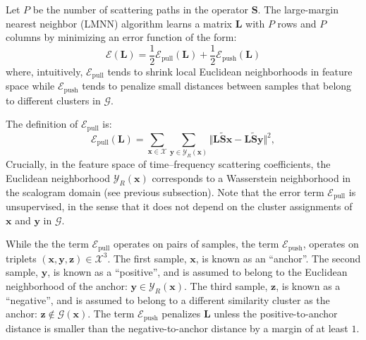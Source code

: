 \documentclass{bmcart}
\begin{document}
Let $P$ be the number of scattering paths in the operator $\mathbf{S}$. The large-margin nearest neighbor (LMNN) algorithm learns a matrix $\mathbf{L}$ with $P$ rows and $P$ columns by minimizing an error function of the form:
\begin{equation}
\mathcal{E}(\mathbf{L}) = \frac{1}{2} \mathcal{E}_{\textrm{pull}} (\mathbf{L}) + \frac{1}{2} \mathcal{E}_{\textrm{push}} (\mathbf{L})
\end{equation}
where, intuitively, $\mathcal{E}_{\textrm{pull}}$ tends to shrink local Euclidean neighborhoods in feature space while $\mathcal{E}_{\textrm{push}}$ tends to penalize small distances between samples that belong to different clusters in $\mathcal{G}$.

The definition of $\mathcal{E}_{\textrm{pull}}$ is:
\begin{equation}
\mathcal{E}_{\textrm{pull}} (\mathbf{L}) =
\sum_{\boldsymbol{x}\in\mathcal{X}}
\sum_{\boldsymbol{y}\in\mathcal{Y}_R (\boldsymbol{x})}
\big\Vert
\mathbf{L}\mathbf{\widetilde{S}}\boldsymbol{x} - \mathbf{L}\mathbf{\widetilde{S}}\boldsymbol{y}
\big\Vert^2,
\end{equation}
Crucially, in the feature space of time--frequency scattering coefficients, the Euclidean neighborhood $\mathcal{Y}_R (\boldsymbol{x})$ corresponds to a Wasserstein neighborhood in the scalogram domain (see previous subsection).
Note that the error term $\mathcal{E}_\textrm{pull}$ is unsupervised, in the sense that it does not depend on the cluster assignments of $\boldsymbol{x}$ and $\boldsymbol{y}$ in $\mathcal{G}$.

While the the term $\mathcal{E}_{\textrm{pull}}$ operates on pairs of samples, the term $\mathcal{E}_{\textrm{push}}$, operates on triplets $(\boldsymbol{x}, \boldsymbol{y}, \boldsymbol{z})\in\mathcal{X}^3$.
The first sample, $\boldsymbol{x}$, is known as an ``anchor''.
The second sample, $\boldsymbol{y}$, is known as a ``positive'', and is assumed to belong to the Euclidean neighborhood of the anchor: $\boldsymbol{y} \in \mathcal{Y}_R (\boldsymbol{x})$.
The third sample, $\boldsymbol{z}$, is known as a ``negative'', and is assumed to belong to a different similarity cluster as the anchor: $\boldsymbol{z}\not\in\mathcal{G}(\boldsymbol{x})$.
The term $\mathcal{E}_{\textrm{push}}$ penalizes $\mathbf{L}$ unless the positive-to-anchor distance is smaller than the negative-to-anchor distance by a margin of at least $1$.
\end{document}
